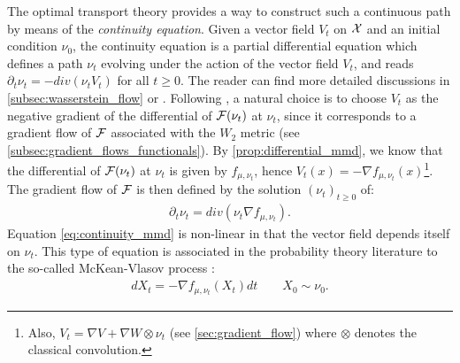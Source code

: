 The optimal transport theory provides a way to construct such a continuous path by means of the \textit{continuity equation}. Given a vector field $V_t$ on ${{\mathcal X}}$ and an initial condition $\nu_0$, the continuity equation is a partial differential equation which defines a path $\nu_t$ evolving under the action of the vector field $V_t$, and reads $\partial_t \nu_t = -div(\nu_t V_t)$ for all $t \geq 0$.
The reader can find more detailed discussions in \cref{subsec:wasserstein_flow} or \cite{Santambrogio:2015}. Following  \cite{ambrosio2008gradient}, a natural choice is to choose $V_t$ as the negative gradient of the differential of ${{\mathcal F}}(\nu_t)$ at $\nu_t$, since it corresponds to a gradient flow of ${{\mathcal F}}$ associated with the $W_2$ metric (see \cref{subsec:gradient_flows_functionals}). %
By \cref{prop:differential_mmd}, we know that the differential of ${{\mathcal F}}(\nu_t)$  at $\nu_t$ is given by $f_{\mu,\nu_t}$, hence $V_t(x) = -\nabla f_{\mu,\nu_t}(x)$\footnote{Also, $V_t=\nabla V+\nabla W \otimes \nu_t$ (see \cref{sec:gradient_flow}) where $\otimes$ denotes the classical convolution.}. The
gradient flow of ${{\mathcal F}}$ is then defined by the solution $(\nu_t)_{t\geq 0}$ of:
\begin{align}\label{eq:continuity_mmd}
	\partial_t \nu_t = div(\nu_t \nabla f_{\mu,\nu_t}).
\end{align}
Equation \cref{eq:continuity_mmd} is non-linear in that the vector field depends itself on $\nu_t$. This type of equation is associated in the probability theory literature to the so-called McKean-Vlasov process \cite{kac1956foundations,mckean1966class}:
\begin{align}\label{eq:mcKean_Vlasov_process}
	d X_t = -\nabla f_{\mu,\nu_t}(X_t)dt \qquad X_0\sim \nu_0.
\end{align}

